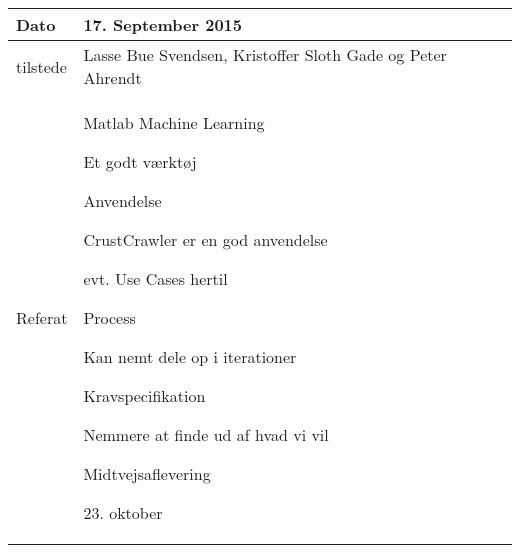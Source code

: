 \begin{center}
	\begin{tabular}{| l | p{10cm} |}
		\hline
		Dato		& 17. September 2015\\ \hline
		tilstede 	& Lasse Bue Svendsen, Kristoffer Sloth Gade og Peter Ahrendt\\ \hline
		Referat		& \vspace{-5mm}\begin{myEnumerate}
			\item Matlab Machine Learning
			\begin{myItemize}				
				\item Et godt værktøj
			\end{myItemize}
			\item Anvendelse
			\begin{myItemize}
				\item CrustCrawler er en god anvendelse
				\item evt. Use Cases hertil
			\end{myItemize}
			\item Process
			\begin{myItemize}
				\item Kan nemt dele op i iterationer
			\end{myItemize}
			\item Kravspecifikation
			\begin{myItemize}
				\item Nemmere at finde ud af hvad vi vil
			\end{myItemize}
			\item Midtvejsaflevering
			\begin{myItemize}
				\item 23. oktober
			\end{myItemize}
		\end{myEnumerate}\\	
		\hline
	\end{tabular}
\end{center}

